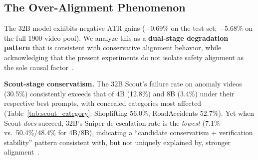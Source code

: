 \subsection{The Over-Alignment Phenomenon}
\label{sec:over_alignment}

The 32B model exhibits negative ATR gains ($-$0.69\% on the test set; $-$5.68\% on the full 1900-video pool). We analyze this as a \textbf{dual-stage degradation pattern} that is consistent with conservative alignment behavior, while acknowledging that the present experiments do not isolate safety alignment as the sole causal factor~\cite{ouyang2022training}.

\textbf{Scout-stage conservatism.}
The 32B Scout's failure rate on anomaly videos (30.5\%) consistently exceeds that of 4B (12.8\%) and 8B (3.4\%) under their respective best prompts, with concealed categories most affected (Table~\ref{tab:scout_category}: Shoplifting 56.0\%, RoadAccidents 52.7\%). Yet when Scout \emph{does} succeed, 32B's Sniper de-escalation rate is the \emph{lowest} (7.1\% vs.\ 50.4\%/48.4\% for 4B/8B), indicating a ``candidate conservatism + verification stability'' pattern consistent with, but not uniquely explained by, stronger alignment~\cite{rottger2024xstest,askell2021general}.

\begin{table}[t]
  \centering
  \caption{Scout failure rate (\%) by anomaly category under each model's best prompt (full 1900-video evaluation).}
  \label{tab:scout_category}
\end{table}

